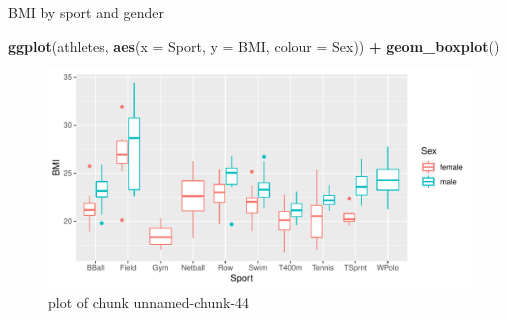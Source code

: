 \documentclass[
  ignorenonframetext,
]{beamer}
\newenvironment{Shaded}{\begin{snugshade}}{\end{snugshade}}
\newcommand{\DataTypeTok}[1]{\textcolor[rgb]{0.13,0.29,0.53}{#1}}
\newcommand{\KeywordTok}[1]{\textcolor[rgb]{0.13,0.29,0.53}{\textbf{#1}}}
\newcommand{\NormalTok}[1]{#1}
\newcommand{\OperatorTok}[1]{\textcolor[rgb]{0.81,0.36,0.00}{\textbf{#1}}}
\newcommand{\StringTok}[1]{\textcolor[rgb]{0.31,0.60,0.02}{#1}}
\begin{document}
\begin{frame}[fragile]{BMI by sport and gender}
\protect\hypertarget{bmi-by-sport-and-gender}{}

\begin{Shaded}
\begin{Highlighting}[]
\KeywordTok{ggplot}\NormalTok{(athletes, }\KeywordTok{aes}\NormalTok{(}\DataTypeTok{x =}\NormalTok{ Sport, }\DataTypeTok{y =}\NormalTok{ BMI, }\DataTypeTok{colour =}\NormalTok{ Sex)) }\OperatorTok{+}
\StringTok{  }\KeywordTok{geom_boxplot}\NormalTok{()}
\end{Highlighting}
\end{Shaded}

\begin{figure}
\centering
\includegraphics{figure/unnamed-chunk-44-1.pdf}
\caption{plot of chunk unnamed-chunk-44}
\end{figure}

\end{frame}
\end{document}
